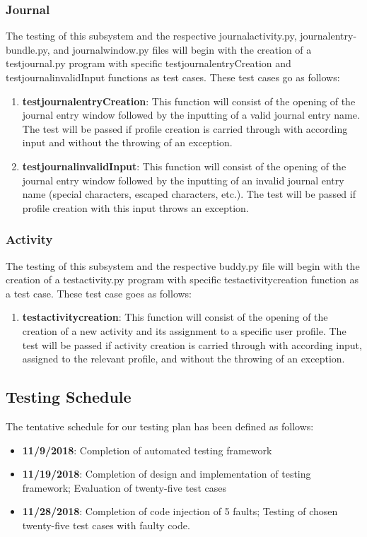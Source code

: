 \documentclass{article}
\begin{document}
\subsubsection{Journal}
The testing of this subsystem and the respective journalactivity.py, journalentry-bundle.py, and journalwindow.py files will begin with the creation of a test\textunderscore journal.py program with specific test\textunderscore journal\textunderscore entryCreation and test\textunderscore journal\textunderscore invalidInput functions as test cases. These test cases go as follows:
\begin{enumerate}
\itemsep-0.5em
\item \textbf{test\textunderscore journal\textunderscore entryCreation}: This function will consist of the opening of the journal entry window followed by the inputting of a valid journal entry name. The test will be passed if profile creation is carried through with according input and without the throwing of an exception.
\item \textbf{test\textunderscore journal\textunderscore invalidInput}: This function will consist of the opening of the journal entry window followed by the inputting of an invalid journal entry name (special characters, escaped characters, etc.). The test will be passed if profile creation with this input throws an exception.
\end{enumerate}
\subsubsection{Activity}
The testing of this subsystem and the respective buddy.py file will begin with the creation of a test\textunderscore activity.py program with specific test\textunderscore activity\textunderscore creation function as a test case. These test case goes as follows:
\begin{enumerate}
\itemsep-0.5em
\item \textbf{test\textunderscore activity\textunderscore creation}: This function will consist of the opening of the creation of a new activity and its assignment to a specific user profile. The test will be passed if activity creation is carried through with according input, assigned to the relevant profile, and without the throwing of an exception.
\end{enumerate}
\subsection{Testing Schedule}
The tentative schedule for our testing plan has been defined as follows:
\begin{itemize}
\itemsep-0.5em
\item[] \textbf{11/9/2018}: Completion of automated testing framework
\item[] \textbf{11/19/2018}: Completion of design and implementation of testing framework; Evaluation of twenty-five test cases
\item[] \textbf{11/28/2018}: Completion of code injection of 5 faults; Testing of chosen twenty-five test cases with faulty code.
\end{itemize}
\end{document}
